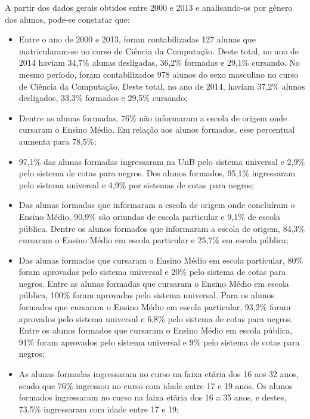 A partir dos dados gerais obtidos entre 2000 e 2013 e analisando-os por gênero dos alunos, pode-se constatar que:
\begin{itemize}
	\item Entre o ano de 2000 e 2013, foram contabilizadas 127 alunas que matricularam-se no curso de Ciência da Computação. Deste total, no ano de 2014 haviam 34,7\% alunas desligadas, 36,2\% formadas e  29,1\% cursando. No mesmo período, foram contabilizados 978 alunos do sexo masculino no curso de Ciência da Computação. Deste total, no ano de 2014, haviam 37,2\% alunos desligados, 33,3\% formados e 29,5\% cursando;
	
	\item Dentre as alunas formadas, 76\% não informaram a escola de origem onde cursaram o Ensino Médio. Em relação aos alunos formados, esse percentual aumenta para 78,5\%;
	
	\item 97,1\% das alunas formadas ingressaram na UnB pelo sistema universal e 2,9\% pelo sistema de cotas para negros.  Dos alunos formados, 95,1\% ingressaram pelo sistema universal e 4,9\% por sistemas de cotas para negros;
	
	\item Das alunas formadas que informaram a escola de origem onde concluíram o Ensino Médio, 90,9\% são oriundas de escola particular e 9,1\% de escola pública.  Dentre os alunos formados que informaram a escola de origem, 84,3\% cursaram o Ensino Médio em escola particular e 25,7\% em escola pública;
	
	\item Das alunas formadas que cursaram o Ensino Médio em escola particular, 80\% foram aprovadas pelo sistema universal e 20\% pelo sistema de cotas para negros. Entre as alunas formadas que cursaram o Ensino Médio em escola pública, 100\% foram aprovadas pelo sistema universal. Para os alunos formados que cursaram o Ensino Médio em escola particular, 93,2\% foram aprovados pelo sistema universal e 6,8\% pelo sistema de cotas para negros. Entre os alunos formados que cursaram o Ensino Médio em escola pública, 91\% foram aprovados pelo sistema universal e 9\% pelo sistema de cotas para negros;
	
	\item As alunas formadas ingressaram no curso na faixa etária dos 16 aos 32 anos, sendo que 76\% ingressou no curso com idade entre 17 e 19 anos.  Os alunos formados ingressaram no curso na faixa etária dos 16 a 35 anos, e destes, 73,5\% ingressaram com idade entre 17 e 19;
	

\end{itemize}
